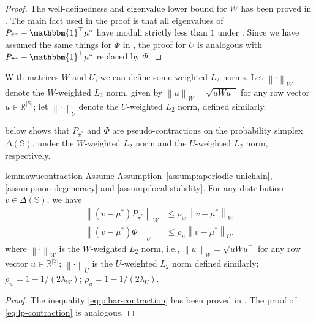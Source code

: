 \documentclass[11pt,letterpaper]{article}
\theoremstyle{plain}
\theoremstyle{definition}
\theoremstyle{remark}
\newcommand{\norm}[1]{\left\lVert#1\right\rVert}
\newcommand{\R}{\mathbb{R}}
\newcommand{\vone}{\mathbbm{1}}
\newcommand{\sspa}{\mathbb{S}}
\newcommand{\pibar}{{\sysbar{\pi}}}
\newcommand{\pibs}{{\pibar^*}}
\newcommand{\sysbar}[1]{\bar{#1}}
\newcommand{\simplex}{\Delta}
\newcommand{\statdist}{\mu^*}
\newcommand{\wmat}{W}
\newcommand{\umat}{U}
\newcommand{\lamw}{\lambda_\wmat}
\newcommand{\lamu}{\lambda_\umat}
\newcommand{\rhow}{\rho_{w}}
\newcommand{\rhou}{\rho_{u}}
\begin{document}
\begin{proof}
    The well-definedness and eigenvalue lower bound for $\wmat$ has been proved in \cite{HonXieCheWan_24}. The main fact used in the proof is that all eigenvalues of $P_\pibs - \vone^\top \statdist$ have moduli strictly less than $1$ under . 
    Since we have assumed the same things for $\Phi$ in , the proof for $\umat$ is analogous with $P_\pibs - \vone^\top \statdist$ replaced by  $\Phi$. 
\end{proof}

With matrices $\wmat$ and $\umat$, we can define some weighted $L_2$ norms. 
Let $\norm{\cdot}_\wmat$ denote the $\wmat$-weighted $L_2$ norm, given by $\norm{u}_\wmat = \sqrt{u \wmat u^\top}$ for any row vector $u\in \R^{|\sspa|}$; let $\norm{\cdot}_\umat$ denote the $\umat$-weighted $L_2$ norm, defined similarly. 

 below shows that $P_\pibs$ and $\Phi$ are pseudo-contractions on the probability simplex $\simplex(\sspa)$, under the $\wmat$-weighted $L_2$ norm and the $\umat$-weighted $L_2$ norm, respectively. 


\begin{restatable}{lemma}{wucontraction}\label{lem:one-step-contraction-W-U}
    Assume Assumption~\ref{assump:aperiodic-unichain}, \ref{assump:non-degeneracy} and \ref{assump:local-stability}. 
    For any distribution $v\in \Delta(\sspa)$, we have
    \begin{align}
        \label{eq:pibar-contraction}
        \norm{(v  - \statdist)P_\pibs}_\wmat &\leq \rhow \norm{v - \statdist}_\wmat \\
         \label{eq:lp-contraction}
        \norm{(v  - \statdist)\Phi}_\umat &\leq \rhou \norm{v - \statdist}_\umat.
    \end{align}
    where $\norm{\cdot}_\wmat$ is the $\wmat$-weighted $L_2$ norm, i.e., $\norm{u}_\wmat = \sqrt{u \wmat u^\top}$ for any row vector $u\in \R^{|\sspa|}$; $\norm{\cdot}_\umat$ is the $\umat$-weighted $L_2$ norm defined similarly; $\rhow = 1 - 1/(2\lamw)$; $\rhou = 1 - 1/(2\lamu)$.  
\end{restatable}



\begin{proof}
    The inequality \eqref{eq:pibar-contraction} has been proved in \cite{HonXieCheWan_24}. The proof of \eqref{eq:lp-contraction} is analogous. 
\end{proof}
\end{document}

